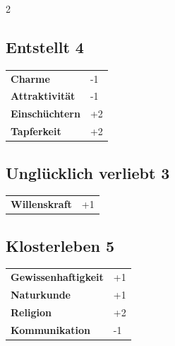 \begin{multicols}{2}
\begin{tcolorbox}
\end{tcolorbox}

\begin{tcolorbox}
    \subsection*{Entstellt \hfill \small{4 }}
    \tcblower




\begin{tabular}{@{}ll@{}}
    \textbf{Charme} & -1\\
    \textbf{Attraktivität} & -1\\
    \textbf{Einschüchtern} & +2\\
    \textbf{Tapferkeit} & +2\\
\end{tabular}


\end{tcolorbox}

\begin{tcolorbox}
    \subsection*{Unglücklich verliebt \hfill \small{3 }}
    \tcblower




\begin{tabular}{@{}ll@{}}
    \textbf{Willenskraft} & +1\\
\end{tabular}


\end{tcolorbox}

\begin{tcolorbox}
    \subsection*{Klosterleben \hfill \small{5 }}
    \tcblower




\begin{tabular}{@{}ll@{}}
    \textbf{Gewissenhaftigkeit} & +1\\
    \textbf{Naturkunde} & +1\\
    \textbf{Religion} & +2\\
    \textbf{Kommunikation} & -1\\
\end{tabular}


\end{tcolorbox}
\end{multicols}
